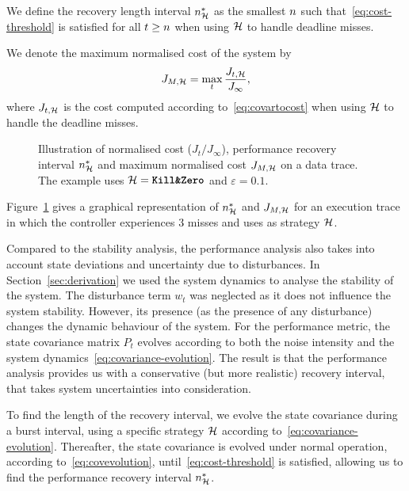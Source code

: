 \begin{definition}%
\label{def:recovery-lenght-interval}%
    We define the recovery length interval $n^*_{\mathcal{H}}$ as the smallest $n$ such that~\eqref{eq:cost-threshold} is satisfied for all $t \geq n$ when using $\mathcal{H}$ to handle deadline misses.
\end{definition}

\begin{definition}%
\label{def:maximum-system-cost}%
    We denote the maximum normalised cost of the system by
    \begin{equation}
        J_{M,\mathcal{H}} = \max_t \frac{J_{t, \mathcal{H}}}{J_\infty},
    \end{equation}
    where $J_{t,\mathcal{H}}$ is the cost computed according to~\eqref{eq:covartocost} when using $\mathcal{H}$ to handle the deadline misses.
\end{definition}
\begin{figure}[t]
    \centering
     
    \caption{Illustration of normalised cost ($J_t/J_\infty$), performance recovery interval $n^*_{\mathcal{H}}$ and maximum normalised cost $J_{M,\mathcal{H}}$ on a data trace. The example uses $\mathcal{H} = \text{\texttt{\textbf{Kill\&Zero}}{}}$ and $\varepsilon=0.1$.}
    \label{fig:recoveryandpeak}
\end{figure}
Figure~\ref{fig:recoveryandpeak} gives a graphical representation of $n^*_{\mathcal{H}}$ and $J_{M,\mathcal{H}}$ for an execution trace in which the controller experiences 3 misses and uses \tKZ{} as strategy $\mathcal{H}$.

Compared to the stability analysis, the performance analysis also takes into account state deviations and uncertainty due to disturbances.
In Section~\ref{sec:derivation} we used the system dynamics to analyse the stability of the system.
The disturbance term $w_t$ was neglected as it does not influence the system stability.
However, its presence (as the presence of any disturbance) changes the dynamic behaviour of the system.
For the performance metric, the state covariance matrix $P_t$ evolves according to both the noise intensity and the system dynamics~\eqref{eq:covariance-evolution}.
The result is that the performance analysis provides us with a conservative (but more realistic) recovery interval, that takes system uncertainties into consideration.

To find the length of the recovery interval, we evolve the state covariance during a burst interval, using a specific strategy $\mathcal{H}$ according to~\eqref{eq:covariance-evolution}.
Thereafter, the state covariance is evolved under normal operation, according to~\eqref{eq:covevolution}, until~\eqref{eq:cost-threshold} is satisfied, allowing us to find the performance recovery interval $n^*_{\mathcal{H}}$.
